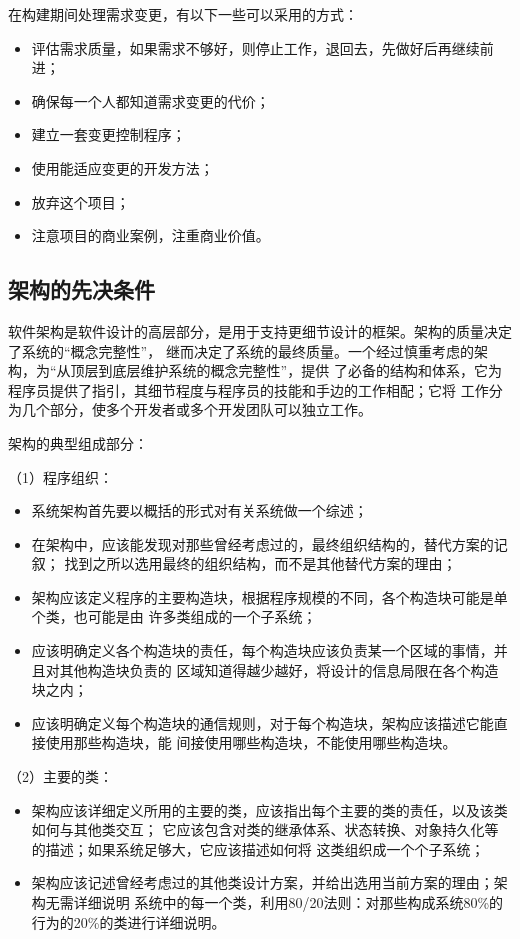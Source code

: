 \documentclass{article}
\begin{document}
\par
在构建期间处理需求变更，有以下一些可以采用的方式：
\begin{itemize}
    \item 评估需求质量，如果需求不够好，则停止工作，退回去，先做好后再继续前进；
    \item 确保每一个人都知道需求变更的代价；
    \item 建立一套变更控制程序；
    \item 使用能适应变更的开发方法；
    \item 放弃这个项目；
    \item 注意项目的商业案例，注重商业价值。
\end{itemize}

\subsection{架构的先决条件}
软件架构是软件设计的高层部分，是用于支持更细节设计的框架。架构的质量决定了系统的“概念完整性”，
继而决定了系统的最终质量。一个经过慎重考虑的架构，为“从顶层到底层维护系统的概念完整性”，提供
了必备的结构和体系，它为程序员提供了指引，其细节程度与程序员的技能和手边的工作相配；它将
工作分为几个部分，使多个开发者或多个开发团队可以独立工作。
\par
架构的典型组成部分：
\par
（1）程序组织：
\begin{itemize}
    \item 系统架构首先要以概括的形式对有关系统做一个综述；
    \item 在架构中，应该能发现对那些曾经考虑过的，最终组织结构的，替代方案的记叙；
    找到之所以选用最终的组织结构，而不是其他替代方案的理由；
    \item 架构应该定义程序的主要构造块，根据程序规模的不同，各个构造块可能是单个类，也可能是由
    许多类组成的一个子系统；
    \item 应该明确定义各个构造块的责任，每个构造块应该负责某一个区域的事情，并且对其他构造块负责的
区域知道得越少越好，将设计的信息局限在各个构造块之内；
    \item 应该明确定义每个构造块的通信规则，对于每个构造块，架构应该描述它能直接使用那些构造块，能
间接使用哪些构造块，不能使用哪些构造块。
\end{itemize}

\par
（2）主要的类：
\begin{itemize}
    \item 架构应该详细定义所用的主要的类，应该指出每个主要的类的责任，以及该类如何与其他类交互；
    它应该包含对类的继承体系、状态转换、对象持久化等的描述；如果系统足够大，它应该描述如何将
    这类组织成一个个子系统；
    \item 架构应该记述曾经考虑过的其他类设计方案，并给出选用当前方案的理由；架构无需详细说明
    系统中的每一个类，利用80/20法则：对那些构成系统80\%的行为的20\%的类进行详细说明。
\end{itemize}
\end{document}
